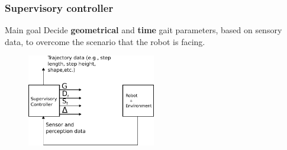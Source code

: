 \documentclass{beamer}
\begin{document}
\begin{frame}\frametitle{Supervisory controller}
	\begin{block}{Main goal}
		\Large Decide \textbf{geometrical} and \textbf{time} gait parameters, based on sensory data, to overcome the scenario that the robot is facing.
	\end{block}
	\begin{figure}[ht]\centering
		\includegraphics[width=0.5\textwidth]{images/Supervisory0.pdf}
	\end{figure}
\end{frame}
\end{document}
